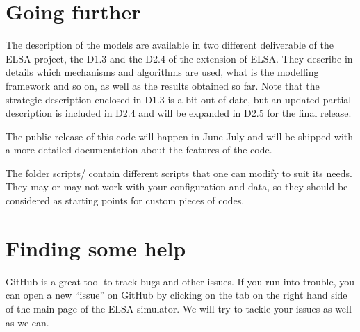 \documentclass[12pt]{article}
\begin{document}
\section{Going further}

The description of the models are available in two different deliverable of the ELSA project, the D1.3 and the D2.4 of the extension of ELSA. They describe in details which mechanisms and algorithms are used, what is the modelling framework and so on, as well as the results obtained so far. Note that the strategic description enclosed in D1.3 is a bit out of date, but an updated partial description is included in D2.4 and will be expanded in D2.5 for the final release.

The public release of this code will happen in June-July and will be shipped with a more detailed documentation about the features of the code.

The folder scripts/ contain different scripts that one can modify to suit its needs. They may or may not work with your configuration and data, so they should be considered as starting points for custom pieces of codes.


\section*{Finding some help}
GitHub is a great tool to track bugs and other issues. If you run into trouble, you can open a new ``issue'' on GitHub by clicking on the tab on the right hand side of the main page of the ELSA simulator. We will try to tackle your issues as well as we can.
\end{document}
